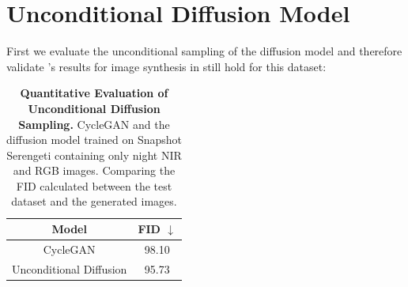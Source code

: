 \section{Unconditional Diffusion Model}
\label{sec:unconditional-diffusion-sampling-evaluation}
First we evaluate the unconditional sampling of the diffusion model and therefore validate \parencite{diffusion-beats-gans}'s results for image synthesis in still hold for this dataset:

\begin{table}[htp!]
    \centering
    \begin{tabular}{c | c}
        Model                   & FID  $\downarrow$ \\
        \hline\hline
        CycleGAN                & 98.10             \\
        Unconditional Diffusion & 95.73
    \end{tabular}
    \caption{
        \textbf{Quantitative Evaluation of Unconditional Diffusion Sampling.} CycleGAN and the diffusion model trained on Snapshot Serengeti \parencite{serengeti} containing only night NIR and RGB images.
        Comparing the FID calculated between the test dataset and the generated images.
    }
    \label{fig:quantitative-evaluation-unconditional-sampling}
\end{table}

